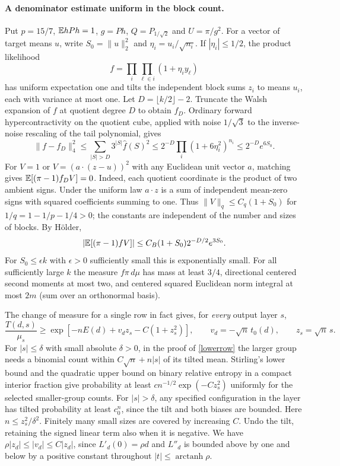 \paragraph{A denominator estimate uniform in the block count.}
Put $p=15/7$, $\mathbb E hPh=1$, $g=Ph$, $Q=P_{1/\sqrt2}$ and $U=\pi/g^2$. For a vector of target means $u$, write $S_0=\|u\|_2^2$ and $\eta_i=u_i/\sqrt{n_i}$. If $|\eta_i|\le1/2$, the product likelihood
\[
 f=\prod_i\prod_{\ell\in i}(1+\eta_i y_\ell)
\]
has uniform expectation one and tilts the independent block sums $z_i$ to means $u_i$, each with variance at most one. Let $D=\lfloor k/2\rfloor-2$. Truncate the Walsh expansion of $f$ at quotient degree $D$ to obtain $f_D$. Ordinary forward hypercontractivity on the quotient cube, applied with noise $1/\sqrt3$ to the inverse-noise rescaling of the tail polynomial, gives
\[
 \|f-f_D\|_4^2\le\sum_{|S|>D}3^{|S|}\widehat f(S)^2
 \le2^{-D}\prod_i(1+6\eta_i^2)^{n_i}\le2^{-D}e^{6S_0}.
\]
For $V=1$ or $V=(a\cdot(z-u))^2$ with any Euclidean unit vector $a$, matching gives $\mathbb E[(\pi-1)f_DV]=0$. Indeed, each quotient coordinate is the product of two ambient signs. Under the uniform law $a\cdot z$ is a sum of independent mean-zero signs with squared coefficients summing to one. Thus $\|V\|_q\le C_q(1+S_0)$ for $1/q=1-1/p-1/4>0$; the constants are independent of the number and sizes of blocks. By H\"older,
\[
 |\mathbb E[(\pi-1)f V]|\le C_B(1+S_0)2^{-D/2} e^{3S_0}.
\]
For $S_0\le\epsilon k$ with $\epsilon>0$ sufficiently small this is exponentially small. For all sufficiently large $k$ the measure $f\pi\,d\mu$ has mass at least $3/4$, directional centered second moments at most two, and centered squared Euclidean norm integral at most $2m$ (sum over an orthonormal basis).

The change of measure for a single row in fact gives, for \emph{every} output layer $s$,
\[
 \frac{T(d,s)}{\mu_s}\ge\exp[-nE(d)+v_d z_s-C(1+z_s^2)],
 \qquad v_d=-\sqrt n\,t_0(d),\qquad z_s=\sqrt n\,s .
\]
For $|s|\le\delta$ with small absolute $\delta>0$, in the proof of \eqref{lowerrow} the larger group needs a binomial count within $C\sqrt n+n|s|$ of its tilted mean. Stirling's lower bound and the quadratic upper bound on binary relative entropy in a compact interior fraction give probability at least $c n^{-1/2}\exp(-Cz_s^2)$ uniformly for the selected smaller-group counts. For $|s|>\delta$, any specified configuration in the layer has tilted probability at least $c_0^n$, since the tilt and both biases are bounded. Here $n\le z_s^2/\delta^2$. Finitely many small sizes are covered by increasing $C$. Undo the tilt, retaining the signed linear term also when it is negative. We have $\rho |z_d|\le |v_d|\le C|z_d|$, since $L'_d(0)=\rho d$ and $L''_d$ is bounded above by one and below by a positive constant throughout $|t|\le\operatorname{arctanh}\rho$.

